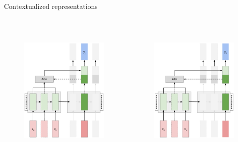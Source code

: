 \documentclass[12pt,aspectratio=169,handout]{beamer}
\begin{document}
\begin{frame}{Contextualized representations}

	\begin{columns}[T] %
	
		\begin{column}{.48\textwidth}
	
		\begin{figure}[h]
			\includegraphics[height=7cm]{seq2seq_attention_t2.pdf}
		\end{figure}
		\end{column}
		\pause
		\begin{column}{.48\textwidth}
			\begin{figure}[h]
				\includegraphics[height=7cm]{seq2seq_attention_t3.pdf}
			\end{figure}
		\end{column}
	
	\end{columns}
	
\end{frame}
\end{document}
